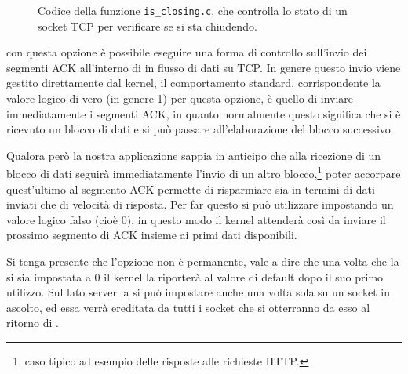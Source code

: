 \begin{basedescript}{\desclabelwidth{1.5cm}\desclabelstyle{\nextlinelabel}}
\begin{figure}[!htbp]
  \footnotesize \centering
  \begin{minipage}[c]{\codesamplewidth}
  \end{minipage}
  \caption{Codice della funzione \texttt{is\_closing.c}, che controlla lo stato
    di un socket TCP per verificare se si sta chiudendo.}
  \label{fig:is_closing}
\end{figure}



\item[\constd{TCP\_QUICKACK}] con questa opzione è possibile eseguire una forma
  di controllo sull'invio dei segmenti ACK all'interno di in flusso di dati su
  TCP. In genere questo invio viene gestito direttamente dal kernel, il
  comportamento standard, corrispondente la valore logico di vero (in genere
  1) per questa opzione, è quello di inviare immediatamente i segmenti ACK, in
  quanto normalmente questo significa che si è ricevuto un blocco di dati e si
  può passare all'elaborazione del blocco successivo.

  Qualora però la nostra applicazione sappia in anticipo che alla ricezione di
  un blocco di dati seguirà immediatamente l'invio di un altro
  blocco,\footnote{caso tipico ad esempio delle risposte alle richieste HTTP.}
  poter accorpare quest'ultimo al segmento ACK permette di risparmiare sia in
  termini di dati inviati che di velocità di risposta. Per far questo si può
  utilizzare  impostando un valore logico falso (cioè 0),
  in questo modo il kernel attenderà così da inviare il prossimo segmento di
  ACK insieme ai primi dati disponibili.

  Si tenga presente che l'opzione non è permanente, vale a dire che una volta
  che la si sia impostata a 0 il kernel la riporterà al valore di default dopo
  il suo primo utilizzo. Sul lato server la si può impostare anche una volta
  sola su un socket in ascolto, ed essa verrà ereditata da tutti i socket che
  si otterranno da esso al ritorno di .



\end{basedescript}
